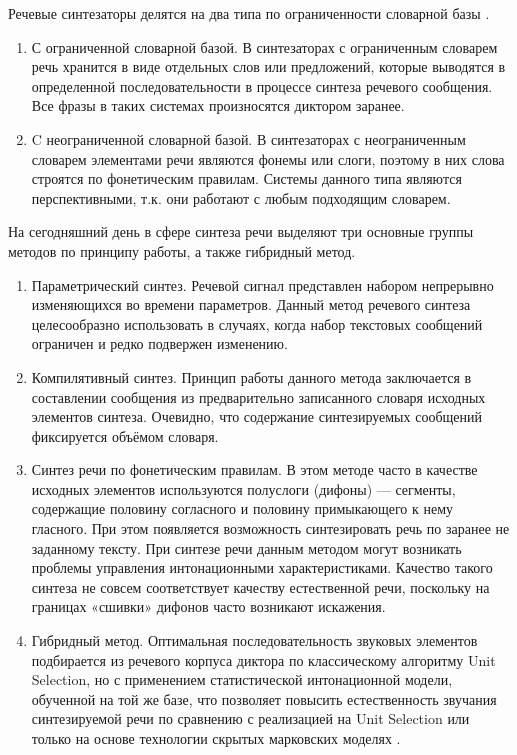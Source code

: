 Речевые синтезаторы делятся на два типа по ограниченности словарной базы \cite{quality}. 
\begin{enumerate}
	\item С ограниченной словарной базой. В синтезаторах с ограниченным словарем речь хранится в виде отдельных слов или предложений, которые выводятся в определенной последовательности в процессе синтеза речевого сообщения. Все фразы в таких системах произносятся диктором заранее.
	\item C неограниченной словарной базой. В синтезаторах с неограниченным словарем элементами речи являются фонемы или слоги, поэтому в них слова строятся по фонетическим правилам. Системы данного типа являются перспективными, т.к. они работают с любым подходящим словарем.
\end{enumerate}

На сегодняшний день в сфере синтеза речи выделяют три основные группы методов по принципу работы, а также гибридный метод.
\begin{enumerate}
	\item Параметрический синтез. Речевой сигнал представлен набором непрерывно изменяющихся во времени параметров. Данный метод речевого синтеза целесообразно использовать в случаях, когда набор текстовых сообщений ограничен и редко подвержен изменению.
	\item Компилятивный синтез. Принцип работы данного метода заключается в составлении сообщения из предварительно записанного словаря исходных элементов синтеза. Очевидно, что содержание синтезируемых сообщений фиксируется объёмом словаря.
	\item Синтез речи по фонетическим правилам. В этом методе часто в качестве исходных элементов используются полуслоги (дифоны) --- сегменты, содержащие половину согласного и половину примыкающего к нему гласного. При этом появляется возможность синтезировать речь по заранее не заданному тексту. При синтезе речи данным методом могут возникать проблемы управления интонационными характеристиками. Качество такого синтеза не совсем соответствует качеству естественной речи, поскольку на границах «сшивки» дифонов часто возникают искажения.
	\item Гибридный метод. Оптимальная последовательность звуковых элементов подбирается из речевого корпуса диктора по классическому алгоритму Unit Selection, но с применением статистической интонационной модели, обученной на той же базе, что позволяет повысить естественность звучания синтезируемой речи по сравнению с реализацией на Unit Selection или только на основе технологии скрытых марковских моделях \cite{hybrid}.
\end{enumerate}

